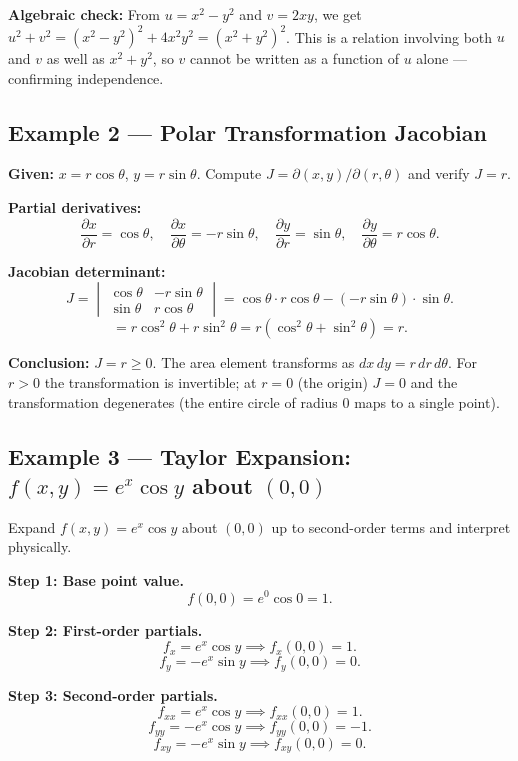 \documentclass[12pt,a4paper]{article}
\begin{document}
\textbf{Algebraic check:} From \( u = x^{2}-y^{2} \) and \( v = 2xy \), we get \( u^{2}+v^{2} = (x^{2}-y^{2})^{2} + 4x^{2}y^{2} = (x^{2}+y^{2})^{2} \). This is a relation involving both \( u \) and \( v \) as well as \( x^{2}+y^{2} \), so \( v \) cannot be written as a function of \( u \) alone --- confirming independence.

\subsection*{Example 2 --- Polar Transformation Jacobian}

\textbf{Given:} \( x = r\cos\theta \), \( y = r\sin\theta \). Compute \( J = \partial(x,y)/\partial(r,\theta) \) and verify \( J = r \).

\textbf{Partial derivatives:}
\[
  \frac{\partial x}{\partial r} = \cos\theta, \quad
  \frac{\partial x}{\partial \theta} = -r\sin\theta, \quad
  \frac{\partial y}{\partial r} = \sin\theta, \quad
  \frac{\partial y}{\partial \theta} = r\cos\theta.
\]

\textbf{Jacobian determinant:}
\[
  J = \begin{vmatrix}
    \cos\theta & -r\sin\theta \\
    \sin\theta &  r\cos\theta
  \end{vmatrix}
  = \cos\theta \cdot r\cos\theta - (-r\sin\theta)\cdot\sin\theta.
\]
\[
  = r\cos^{2}\theta + r\sin^{2}\theta = r(\cos^{2}\theta + \sin^{2}\theta) = r.
\]

\textbf{Conclusion:} \( J = r \geq 0 \). The area element transforms as \( dx\,dy = r\,dr\,d\theta \). For \( r > 0 \) the transformation is invertible; at \( r = 0 \) (the origin) \( J = 0 \) and the transformation degenerates (the entire circle of radius 0 maps to a single point).

\subsection*{Example 3 --- Taylor Expansion: \( f(x,y) = e^{x}\cos y \) about \( (0,0) \)}

Expand \( f(x,y) = e^{x}\cos y \) about \( (0,0) \) up to second-order terms and interpret physically.

\textbf{Step 1: Base point value.}
\[
  f(0,0) = e^{0}\cos 0 = 1.
\]

\textbf{Step 2: First-order partials.}
\[
  f_x = e^{x}\cos y \implies f_x(0,0) = 1.
\]
\[
  f_y = -e^{x}\sin y \implies f_y(0,0) = 0.
\]

\textbf{Step 3: Second-order partials.}
\[
  f_{xx} = e^{x}\cos y \implies f_{xx}(0,0) = 1.
\]
\[
  f_{yy} = -e^{x}\cos y \implies f_{yy}(0,0) = -1.
\]
\[
  f_{xy} = -e^{x}\sin y \implies f_{xy}(0,0) = 0.
\]
\end{document}
